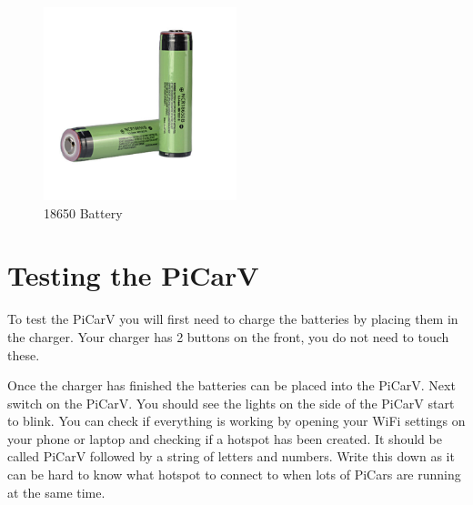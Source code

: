 \documentclass[11pt]{report}
\begin{document}
\begin {figure}[h]
    \centering
    \includegraphics[width=0.5\textwidth]{battery.jpg}
    \caption{18650 Battery}
    \label{fig: 18650 Battery}
\end{figure}
    

\section{Testing the PiCarV}
To test the PiCarV you will first need to charge the batteries by placing them in the charger. Your charger has 2 buttons on the front, you do not need to touch these.


Once the charger has finished the batteries can be placed into the PiCarV. Next switch on the PiCarV. You should see the lights on the side of the PiCarV start to blink. You can check if everything is working by opening your WiFi settings on your phone or laptop and checking if a hotspot has been created. It should be called PiCarV followed by a string of letters and numbers. Write this down as it can be hard to know what hotspot to connect to when lots of PiCars are running at the same time.
\end{document}
